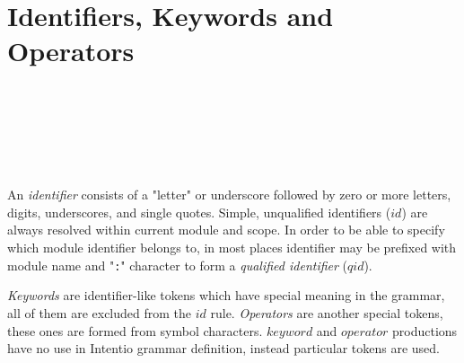 \section{Identifiers, Keywords and Operators}

\begin{bnf}
    \eq {} \\
   \eq {} \ \term{:} \  \\
  \\
   \eq
        \gor   {}
        \gor   {}
        \gor   {}
        \gor   {}
        \gor   {}
        \gor   {}
        \gorln {}
        \gor   {}
        \gor   {}
        \gor   {}
        \gor   {}
        \gor   {}
        \gor   {}
        \gor   {}
        \gorln {}
        \gor   {}
        \gor   {}
        \gor   {}
        \gor   {}
        \gor   {}
        \gor   {}
        \gorln {}
        \gor   {}
        \gor   {}
        \gor   \term{\_} \\
  \\
   \eq
                \term{+}
         \gor   \term{-}
         \gor   \term{*}
         \gor   \term{/}
         \gorln \term{(}
         \gor   \term{)}
         \gor   \term{[}
         \gor   \term{]}
         \gor   \term{\{}
         \gor   \term{\}}
         \gor   \term{;}
         \gorln \term{==}
         \gor   \term{<}
         \gor   \term{<=}
         \gor   \term{>}
         \gor   \term{>=}
         \gor   \term{===}
         \gor   \term{!==}
         \gorln \term{=}
\end{bnf}

An \emph{identifier} consists of a "letter" or underscore followed by zero or more letters, digits, underscores, and single quotes. Simple, unqualified identifiers (\(id\)) are always resolved within current module and scope. In order to be able to specify which module identifier belongs to, in most places identifier may be prefixed with module name and "\texttt{:}" character to form a \emph{qualified identifier} (\(qid\)).

\emph{Keywords} are identifier-like tokens which have special meaning in the grammar, all of them are excluded from the \(id\) rule. \emph{Operators} are another special tokens, these ones are formed from symbol characters. \(keyword\) and \(operator\) productions have no use in Intentio grammar definition, instead particular tokens are used.

